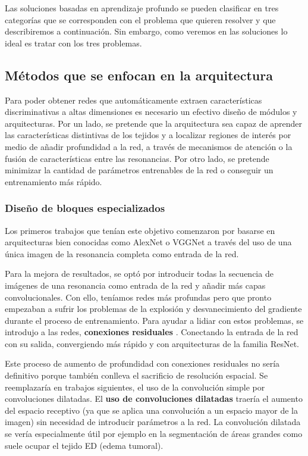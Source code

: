 	Las soluciones basadas en aprendizaje profundo se pueden clasificar en tres categorías que se corresponden con el problema que quieren resolver y que describiremos  a continuación. Sin embargo, como veremos en las soluciones lo ideal es tratar con los tres problemas.
	
	\subsection{Métodos que se enfocan en la arquitectura}
		
		 Para poder obtener redes que automáticamente extraen características discriminativas a altas dimensiones es necesario un efectivo diseño de módulos y arquitecturas. Por un lado, se pretende que la arquitectura sea capaz de aprender las características distintivas de los tejidos y a localizar regiones de interés por medio de añadir profundidad a la red, a través de mecanismos de atención o la fusión de características entre las resonancias. Por otro lado, se pretende minimizar la cantidad de parámetros entrenables de la red o conseguir un entrenamiento más rápido.
		 
		\subsubsection{Diseño de bloques especializados}
			
			Los primeros trabajos que tenían este objetivo comenzaron por basarse en arquitecturas bien conocidas como AlexNet o VGGNet a través del uso de una única imagen de la resonancia completa como entrada de la red.
			
			Para la mejora de resultados, se optó por introducir todas la secuencia de imágenes de una resonancia como entrada de la red y añadir más capas convolucionales. Con ello, teníamos redes más profundas pero que pronto empezaban a sufrir los problemas de la explosión y desvanecimiento del gradiente durante el proceso de entrenamiento. Para ayudar a lidiar con estos problemas, se introdujo a las redes, \textbf{conexiones residuales} \cite{chang2016fully}. Conectando la entrada de la red con su salida, convergiendo más rápido y con arquitecturas de la familia ResNet. 
			
			Este proceso de aumento de profundidad con conexiones residuales no sería definitivo porque también conlleva el sacrificio de resolución espacial. Se reemplazaría en trabajos siguientes, el uso de la convolución simple por convoluciones dilatadas. El \textbf{uso de convoluciones dilatadas} traería el aumento del espacio receptivo (ya que se aplica una convolución a un espacio mayor de la imagen) sin necesidad de introducir parámetros a la red. La convolución dilatada se vería especialmente útil por ejemplo en la segmentación de áreas grandes como suele ocupar el tejido ED (edema tumoral). 
			
